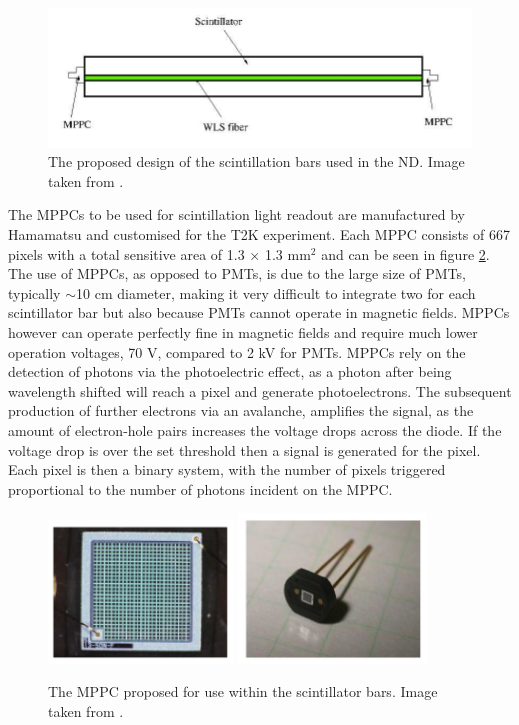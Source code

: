\begin{figure}[htbp]
	\begin{center}
		\includegraphics[width=120mm]{Chapter3/figures/scintBars.png}
	\caption{The proposed design of the scintillation bars used in the ND. Image taken from \cite{lbnoInternal}.}
	\label{fig:scintBars}
	\end{center}
\end{figure}
The MPPCs to be used for scintillation light readout are manufactured by Hamamatsu and customised for the T2K experiment. Each MPPC consists of 667 pixels with a total sensitive area of 1.3 $\times$ 1.3 mm$^{2}$ and can be seen in figure \ref{fig:mppc}. The use of MPPCs, as opposed to PMTs, is due to the large size of PMTs, typically $\sim$10 cm diameter, making it very difficult to integrate two for each scintillator bar but also because PMTs cannot operate in magnetic fields. MPPCs however can operate perfectly fine in magnetic fields and require much lower operation voltages, 70 V, compared to 2 kV for PMTs. MPPCs rely on the detection of photons via the photoelectric effect, as a photon after being wavelength shifted will reach a pixel and generate photoelectrons. The subsequent production of further electrons via an avalanche, amplifies the signal, as the amount of electron-hole pairs increases the voltage drops across the diode. If the voltage drop is over the set threshold then a signal is generated for the pixel. Each pixel is then a binary system, with the number of pixels triggered proportional to the number of photons incident on the MPPC. 
\begin{figure}[htbp]
	\begin{center}
		\includegraphics[width=49mm]{Chapter3/figures/mppc1.png}
		\includegraphics[width=50mm]{Chapter3/figures/mppc2.png}
	\caption{The MPPC proposed for use within the scintillator bars. Image taken from \cite{lbnoEoI}.}
	\label{fig:mppc}
	\end{center}
\end{figure}

